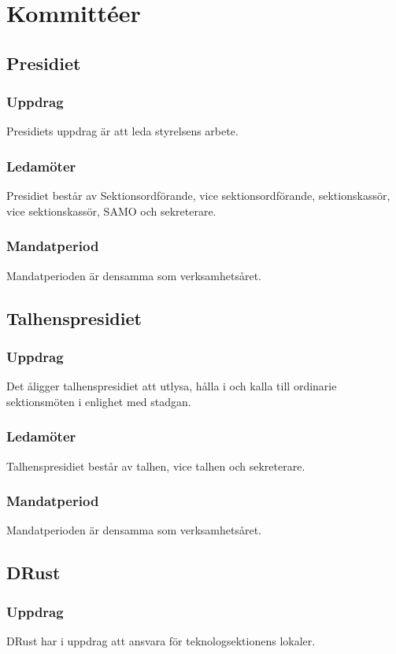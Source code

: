 \section{Kommittéer}

\subsection{Presidiet}
\subsubsection{Uppdrag}
Presidiets uppdrag är att leda styrelsens arbete.
\subsubsection{Ledamöter}
Presidiet består av Sektionsordförande, vice sektionsordförande, sektionskassör, vice sektionskassör, SAMO och sekreterare.
\subsubsection{Mandatperiod}
Mandatperioden är densamma som verksamhetsåret.

\subsection{Talhenspresidiet}
\subsubsection{Uppdrag}
Det åligger talhenspresidiet att utlysa, hålla i och kalla till ordinarie sektionsmöten i enlighet med stadgan.
\subsubsection{Ledamöter}
Talhenspresidiet består av talhen, vice talhen och sekreterare.
\subsubsection{Mandatperiod}
Mandatperioden är densamma som verksamhetsåret.

\subsection{DRust}
\subsubsection{Uppdrag}
DRust har i uppdrag att ansvara för teknologsektionens lokaler.
